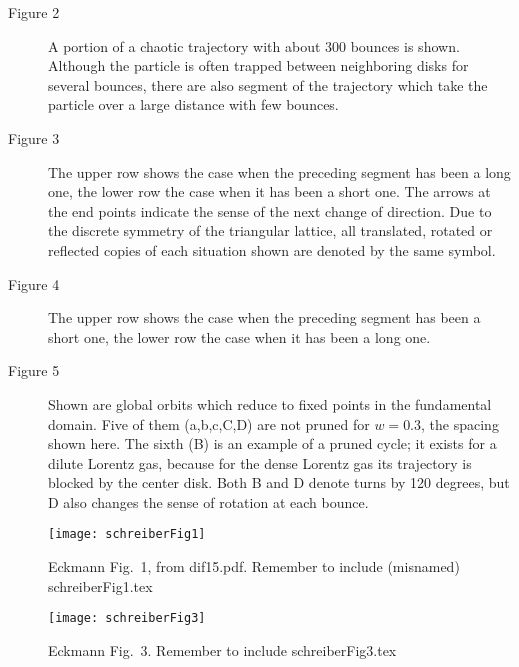 \documentclass[pre,preprint,groupedaddress,showpacs,showkeys]{revtex4}
\begin{document}
\begin{description}

\item[Figure 2]
 A portion of a chaotic trajectory with about 300 bounces is shown.
Although the particle is often trapped between neighboring disks
for several bounces, there are also
segment of the trajectory
which take the particle over a large distance with few bounces.

\item[Figure 3]
The upper row shows the case when the preceding
segment has been a long one,
the lower row the case when it has been a short one.
The arrows at the end points
indicate the sense of the next change of direction.
Due to the discrete symmetry of the triangular lattice,
all translated, rotated or reflected copies of each
situation shown are denoted by the same symbol.

\item[Figure 4]
The upper row shows the case when the preceding
segment has been a short one,
the lower row the case when it has been a long one.

 \item[Figure 5]
Shown are global orbits which reduce to fixed points in the fundamental
domain. Five of them (a,b,c,C,D) are not pruned for $w=0.3$,
the spacing shown here. The sixth (B) is an example of a pruned
cycle; it exists for a dilute Lorentz gas, because
for the dense Lorentz gas its trajectory is blocked by the center
disk. Both B and D denote turns by 120 degrees, but
D also changes the sense of rotation at each bounce.
\end{description}

\begin{figure}
\begin{center}
\texttt{[image: schreiberFig1]}
\end{center}
\caption{
Eckmann Fig.~1, from dif15.pdf. Remember to include
(misnamed) schreiberFig1.tex
    }
\label{schreiberFig1}
\end{figure}

\begin{figure}
\begin{center}
\texttt{[image: schreiberFig3]}
\end{center}
\caption{
Eckmann Fig.~3. Remember to include
schreiberFig3.tex
    }
\label{schreiberFig3}
\end{figure}
\end{document}

